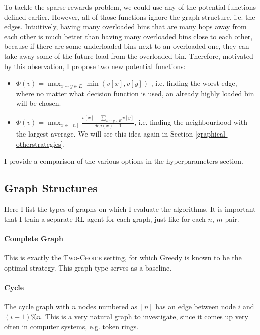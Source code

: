 To tackle the sparse rewards problem, we could use any of the potential functions defined earlier. However, all of those functions ignore the graph structure, i.e. the edges. Intuitively, having many overloaded bins that are many hops away from each other is much better than having many overloaded bins close to each other, because if there are some underloaded bins next to an overloaded one, they can take away some of the future load from the overloaded bin. Therefore, motivated by this observation, I propose two new potential functions:


\begin{itemize}
    \item 
    $\Phi(v)=\max_{x\sim y \in E} \min(v[x], v[y])$ , i.e. finding the worst edge, where no matter what decision function is used, an already highly loaded bin will be chosen.
    \item
    $\Phi(v)=\max_{x \in [n]} \frac{v[x]+\sum_{x\sim y \in E}v[y]}{deg(x)+1}$, i.e. finding the neighbourhood with the largest average. We will see this idea again in Section \ref{graphical-otherstrategies}.
\end{itemize}

I provide a comparison of the various options in the hyperparameters section.


\subsection{Graph Structures}


Here I list the types of graphs on which I evaluate the algorithms. It is important that I train a separate RL agent for each graph, just like for each $n$, $m$ pair.


\paragraph{Complete Graph} This is exactly the \textsc{Two-Choice} setting, for which Greedy is known to be the optimal strategy. This graph type serves as a baseline.


\paragraph{Cycle} The cycle graph with $n$ nodes numbered as $[n]$ has an edge between node $i$ and $(i+1)\%n$. This is a very natural graph to investigate, since it comes up very often in computer systems, e.g. token rings.


